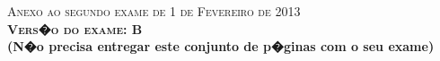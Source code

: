 \documentclass{docist}
\begin{document}
\thispagestyle{empty}

\begin{center}
  {\Large \textsc{Anexo ao segundo exame de 1 de Fevereiro de 2013\\[2ex]
      \textbf{Vers�o do exame: B}\\[2ex]}}
  {\normalsize  \textbf{(N�o precisa entregar este conjunto de p�ginas com o seu exame)}}
\end{center}



\wikipediaWarning

\qZeroMQScaleMulticore

\qZeroMQAsLibrary

\qZeroMQBroker

\qZeroMQExtensibleEngines

\qZeroMQBSDSockets

\qnginxProcesses

\qnginxCaching

\qnginxWorkers

\qnginxWorkerParallel

\qnginxCTenKProblem

\qGHCBlockLayer

\qGHCBlockLayerQualities

\qGHCRewriteRules

\qGHCAsLibrary

\qGHCCodeGeneration

\qWebCacheModule

\qWebCacheGlobal

\qWebDistributedCache

\qWebMissingCacheNode

\qMemcachedModules

\qDomainLogicFenix

\qPerformance

\qSubcontractors

\qAspects

\qSOA

\qArqEmailMUAMTA

\qAvailability

\qSecurity

\qWebEvolution

\qTiers
\end{document}

